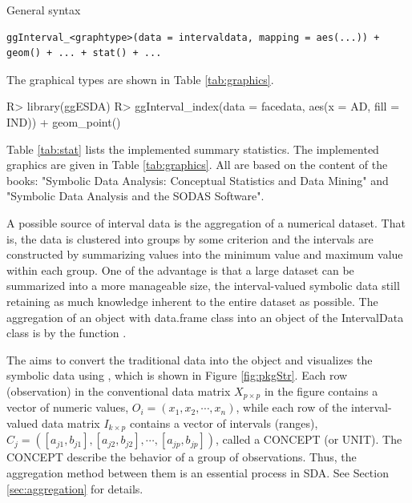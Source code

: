 \documentclass[article]{jss}
\newcommand{\fct}[1]{\code{#1()}}
\begin{document}
General  syntax

\begin{verbatim}
ggInterval_<graphtype>(data = intervaldata, mapping = aes(...)) + geom() + ... + stat() + ...
\end{verbatim}

\begin{footnotesize}
The graphical types are shown in Table \ref{tab:graphics}.
\end{footnotesize}



\begin{CodeChunk}
\begin{CodeInput}
R> library(ggESDA)
R> ggInterval_index(data = facedata, aes(x = AD, fill = IND)) +
         geom_point()
\end{CodeInput}
\end{CodeChunk}

Table \ref{tab:stat} lists the implemented summary statistics.
The implemented graphics are given in Table \ref{tab:graphics}.
All are based on the content of the books:
"Symbolic Data Analysis: Conceptual Statistics and Data Mining"
and
"Symbolic Data Analysis and the SODAS Software".


A possible source of interval data is the aggregation of a numerical
dataset. That is, the data is clustered into groups by some criterion
and the intervals are constructed by summarizing values into the
minimum value and maximum value within each group. One of the
advantage is that a large dataset can be summarized into a more
manageable size, the interval-valued symbolic data still retaining as
much knowledge inherent to the entire dataset as possible. The
aggregation of an object with data.frame class into an object of the
IntervalData class is by the function \fct{classic2sym()}.

The 
aims to convert the traditional data into the  object and
visualizes the symbolic data using , which is shown in
Figure \ref{fig:pkgStr}. Each row (observation) in the conventional
data matrix $X_{p \times p}$ in the figure contains a vector of
numeric values, $O_i = (x_1,x_2,\cdots,x_n)$, while each row of the
interval-valued data matrix $I_{k \times p}$ contains a vector of
intervals (ranges), $C_j =
([a_{j1},b_{j1}],[a_{j2},b_{j2}],\cdots,[a_{jp},b_{jp}])$, called a
CONCEPT (or UNIT). The CONCEPT describe the behavior of a group of
observations. Thus, the aggregation method between them is an
essential process in SDA. See Section \ref{sec:aggregation} for details.
\end{document}
